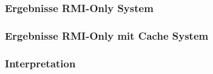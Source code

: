 \subsubsection{Ergebnisse RMI-Only System}
\subsubsection{Ergebnisse RMI-Only mit Cache System}
\subsubsection{Interpretation}

